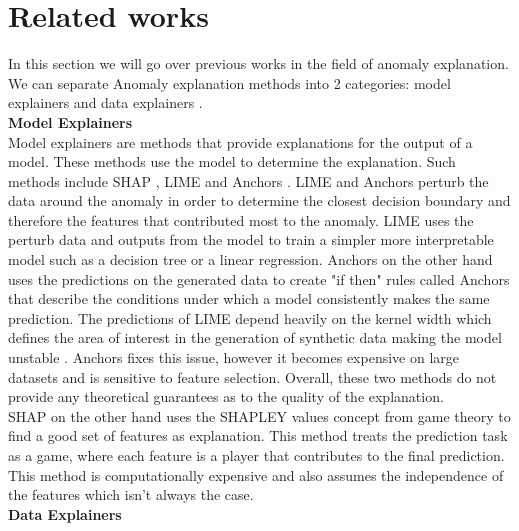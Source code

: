 \documentclass[oneside, a4paper, onecolumn, 11pt]{article}
\begin{document}
\section{Related works}
In this section we will go over previous works in the field of anomaly explanation. We can separate Anomaly explanation methods into 2 categories: model explainers and data explainers \cite{Li2023SurveyXAD} \cite{Panjei2022OutlierExplanations}.\\
\textbf{Model Explainers}\\
Model explainers are methods that provide explanations for the output of a model. These methods use the model to determine the explanation. Such methods include SHAP \cite{shap}, LIME \cite{lime} and Anchors \cite{anchors}. LIME and Anchors perturb the data around the anomaly in order to determine the closest decision boundary and therefore the features that contributed most to the anomaly. LIME uses the perturb data and outputs from the model to train a simpler more interpretable model such as a decision tree or a linear regression. Anchors on the other hand uses the predictions on the generated data to create "if then" rules called Anchors that describe the conditions under which a model consistently makes the same prediction. The predictions of LIME depend heavily on the kernel width which defines the area of interest in the generation of synthetic data making the model unstable \cite{optilime}. Anchors fixes this issue, however it becomes expensive on large datasets and is sensitive to feature selection. Overall, these two methods do not provide any theoretical guarantees as to the quality of the explanation.\\
SHAP on the other hand uses the SHAPLEY values concept from game theory to find a good set of features as explanation. This method treats the prediction task as a game, where each feature is a player that contributes to the final prediction. This method is computationally expensive and also assumes the independence of the features which isn't always the case.\\
\textbf{Data Explainers}
\end{document}
